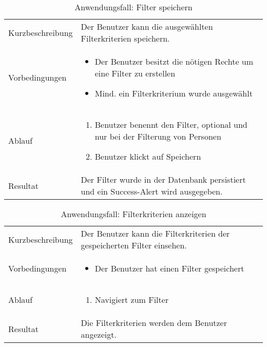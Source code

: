 \begin{table}[h!]
   \begin{tabular}{|L{0.3\textwidth}|L{0.6\textwidth}|}
       \hline
         \\[4pt]
       \hline
       Kurzbeschreibung & Der Benutzer kann die ausgewählten Filterkriterien speichern. \\
       \hline
       Vorbedingungen & 
       \begin{itemize}
         \item Der Benutzer besitzt die nötigen Rechte um eine Filter zu erstellen
         \item Mind. ein Filterkriterium wurde ausgewählt
       \end{itemize} \\
       \hline
       Ablauf & \begin{enumerate}
         \item Benutzer benennt den Filter, optional und nur bei der Filterung von Personen
         \item Benutzer klickt auf Speichern
       \end{enumerate}  \\
       \hline
       Resultat & Der Filter wurde in der Datenbank persistiert und ein Success-Alert wird ausgegeben. \\
       \hline
   \end{tabular}
   \caption{Anwendungsfall: Filter speichern}
\end{table}

\begin{table}[h!]
   \begin{tabular}{|L{0.3\textwidth}|L{0.6\textwidth}|}
      \hline
        \\[4pt]
      \hline
      Kurzbeschreibung & Der Benutzer kann die Filterkriterien der gespeicherten Filter einsehen. \\
      \hline
      Vorbedingungen & 
      \begin{itemize}
         \item Der Benutzer hat einen Filter gespeichert
      \end{itemize}  \\
      \hline
      Ablauf & \begin{enumerate}
      \item Navigiert zum Filter
      \end{enumerate}  \\
      \hline
      Resultat & Die Filterkriterien werden dem Benutzer angezeigt. \\
      \hline
   \end{tabular}
   \caption{Anwendungsfall: Filterkriterien anzeigen}
\end{table}

